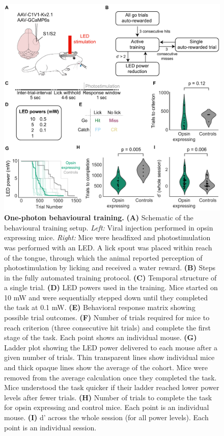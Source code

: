 \begin{figure}[h]
\includegraphics[scale=0.75]{figures/1-photon-behaviour.pdf}
\caption[\textbf{One-photon behavioural training.}]{
\textbf{One-photon behavioural training.}
\textbf{(A)} Schematic of the behavioural training setup. \textit{Left:} Viral injection performed in opsin expressing mice. \textit{Right:} Mice were headfixed and photostimulation was performed with an LED. A lick spout was placed within reach of the tongue, through which the animal reported perception of photostimulation by licking and received a water reward. \textbf{(B)} Steps in the fully automated training protocol. \textbf{(C)} Temporal structure of a single trial.  \textbf{(D)} LED powers used in the training. Mice started on 10 mW and were sequentially stepped down until they completed the task at 0.1 mW.  \textbf{(E)} Behavioral response matrix showing possible trial outcomes. \textbf{(F)} Number of trials required for mice to reach criterion (three consecutive hit trials) and complete the first stage of the task. Each point shows an individual mouse. \textbf{(G)} Ladder plot showing the LED power delivered to each mouse after a given number of trials. Thin transparent lines show individual mice and thick opaque lines show the average of the cohort. Mice were removed from the average calculation once they completed the task. Mice understood the task quicker if their ladder reached lower power levels after fewer trials. \textbf{(H)} Number of trials to complete the task for opsin expressing and control mice. Each point is an individual mouse. \textbf{(I)} d' across the whole session (for all power levels). Each point is an individual session.
} 
\label{fig:1-photon-behaviour}
\end{figure}

